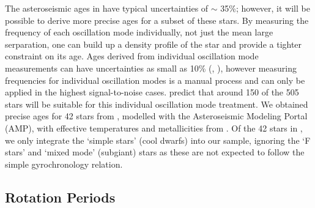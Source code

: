\documentclass[10pt,preprint]{aastex}
\begin{document}
The asteroseismic ages in \citet{Chaplin2013} have typical uncertainties of $\sim$ 35\%; however, it will be possible to derive more precise ages for a subset of these stars.
By measuring the frequency of each oscillation mode individually, not just the mean large serparation, one can build up a density profile of the star and provide a tighter constraint on its age.
Ages derived from individual oscillation mode measurements can have uncertainties as small as 10\% (\citet{Brown1994}, \citet{SilvaAguirre2013}), however measuring frequencies for individual oscillation modes is a manual process and can only be applied in the highest signal-to-noise cases.
\citet{Chaplin2013} predict that around 150 of the 505 stars will be suitable for this individual oscillation mode treatment.
We obtained precise ages for 42 stars from \citet{Metcalfe2014}, modelled with the Asteroseismic Modeling Portal (AMP), with effective temperatures and metallicities from \citet{Bruntt2012}.
Of the 42 stars in \citet{Metcalfe2014}, we only integrate the `simple stars' (cool dwarfs) into our sample, ignoring the `F stars' and `mixed mode' (subgiant) stars as these are not expected to follow the simple gyrochronology relation.

\subsection{Rotation Periods}
\label{sec:rotation_periods}
\end{document}
